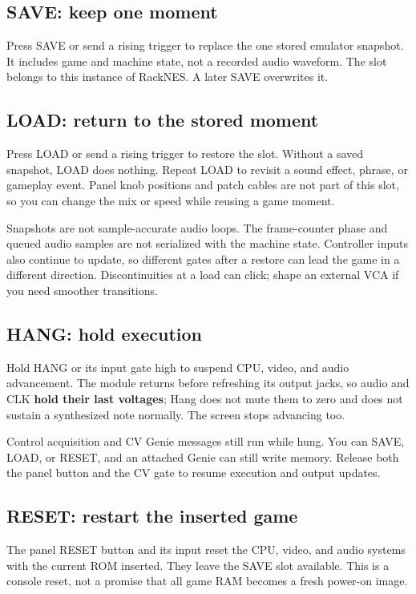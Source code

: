 \subsection{SAVE: keep one moment}
Press SAVE or send a rising trigger to replace the one stored emulator
snapshot. It includes game and machine state, not a recorded audio waveform.
The slot belongs to this instance of RackNES. A later SAVE overwrites it.

\subsection{LOAD: return to the stored moment}
Press LOAD or send a rising trigger to restore the slot. Without a saved
snapshot, LOAD does nothing. Repeat LOAD to revisit a sound effect, phrase,
or gameplay event. Panel knob positions and patch cables are not part of
this slot, so you can change the mix or speed while reusing a game moment.

Snapshots are not sample-accurate audio loops. The frame-counter phase and
queued audio samples are not serialized with the machine state. Controller
inputs also continue to update, so different gates after a restore can lead
the game in a different direction. Discontinuities at a load can click;
shape an external VCA if you need smoother transitions.

\subsection{HANG: hold execution}
Hold HANG or its input gate high to suspend CPU, video, and audio advancement.
The module returns before refreshing its output jacks, so audio and CLK
\textbf{hold their last voltages}; Hang does not mute them to zero and does
not sustain a synthesized note normally. The screen stops advancing too.

Control acquisition and CV Genie messages still run while hung. You can
SAVE, LOAD, or RESET, and an attached Genie can still write memory. Release
both the panel button and the CV gate to resume execution and output updates.

\subsection{RESET: restart the inserted game}
The panel RESET button and its input reset the CPU, video, and audio systems
with the current ROM inserted. They leave the SAVE slot available. This is
a console reset, not a promise that all game RAM becomes a fresh power-on
image.

